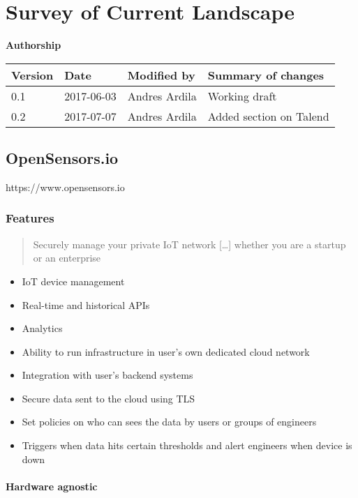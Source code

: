 \section{Survey of Current Landscape}\label{survey-of-current-landscape}

\textbf{Authorship}

\begin{longtable}[]{@{}llll@{}}
\toprule
Version & Date & Modified by & Summary of changes\tabularnewline
\midrule
\endhead
0.1 & 2017-06-03 & Andres Ardila & Working draft\tabularnewline
0.2 & 2017-07-07 & Andres Ardila & Added section on
Talend\tabularnewline
\bottomrule
\end{longtable}


\subsection{OpenSensors.io}\label{opensensors.io}

https://www.opensensors.io

\subsubsection{Features}\label{features}

\begin{quote}
Securely manage your private IoT network {[}\ldots{}{]} whether you are
a startup or an enterprise
\end{quote}

\begin{itemize}
\tightlist
\item
  IoT device management
\item
  Real-time and historical APIs
\item
  Analytics
\item
  Ability to run infrastructure in user's own dedicated cloud network
\item
  Integration with user's backend systems
\item
  Secure data sent to the cloud using TLS
\item
  Set policies on who can sees the data by users or groups of engineers
\item
  Triggers when data hits certain thresholds and alert engineers when
  device is down
\end{itemize}

\paragraph{Hardware agnostic}\label{hardware-agnostic}

